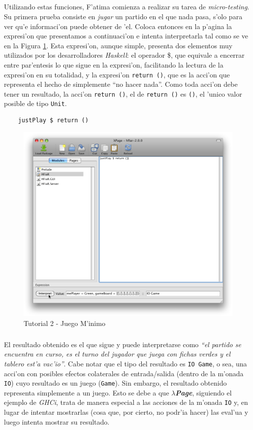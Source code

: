 \documentclass[a4paper]{article}
\newcommand{\haskell}{\textsl{Haskell}}
\newcommand{\hpage}{\textbf{\textsl{$\lambda$Page}}}
\begin{document}
\subparagraph{}Utilizando estas funciones, F'atima comienza a realizar su tarea de \textsl{micro-testing}.  Su primera prueba consiste en \textit{jugar} un partido en el que nada pasa, s'olo para ver qu'e informaci'on puede obtener de 'el.  Coloca entonces en la p'agina la expresi'on que presentamos a continuaci'on e intenta interpretarla tal como se ve en la Figura \ref{tut205}.  Esta expresi'on, aunque simple, presenta dos elementos muy utilizados por los desarrolladores \haskell: el operador \$, que equivale a encerrar entre par'entesis lo que sigue en la expresi'on, facilitando la lectura de la expresi'on en su totalidad, y la expresi'on \texttt{return ()}, que es la acci'on que representa el hecho de simplemente ``no hacer nada''.  Como toda acci'on debe tener un resultado, la acci'on \texttt{return ()}, el de \texttt{return ()} es \texttt{()}, el 'unico valor posible de tipo \texttt{Unit}.
\lstset{language=haskell, frame=single, tabsize=4}
\begin{center}\begin{lstlisting}
	justPlay $ return ()
\end{lstlisting}\end{center}
\begin{figure}[hp]
	\begin{center}
        	\includegraphics[width=.75\textwidth]{pictures/tut2/05}
		\caption{Tutorial 2 - Juego M'inimo}
		\label{tut205}
	\end{center}
\end{figure}
\subparagraph{}El resultado obtenido es el que sigue y puede interpretarse como \textsl{``el partido se encuentra en curso, es el turno del jugador que juega con fichas verdes y el tablero est'a vac'io''}.  Cabe notar que el tipo del resultado es \texttt{IO Game}, o sea, una acci'on con posibles efectos colaterales de entrada/salida (dentro de la m'onada \texttt{IO}) cuyo resultado es un juego (\texttt{Game}).  Sin embargo, el resultado obtenido representa simplemente a un juego.  Esto se debe a que \hpage, siguiendo el ejemplo de \textsl{GHCi}, trata de manera especial a las acciones de la m'onada \texttt{IO} y, en lugar de intentar mostrarlas (cosa que, por cierto, no podr'ia hacer) las eval'ua y luego intenta mostrar su resultado.
\end{document}
